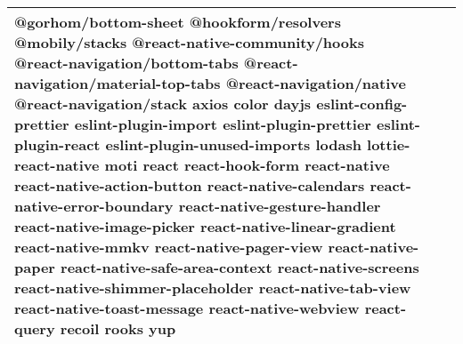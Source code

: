\documentclass[conference, a4paper]{IEEEtran}
\begin{document}
\begin{table} [htp]
\begin{tabular}{p{1.7cm}|p{2.8cm}|p{2.5cm}}
 \newline @gorhom/bottom-sheet \newline @hookform/resolvers \newline @mobily/stacks \newline @react-native-community/hooks \newline @react-navigation/bottom-tabs \newline @react-navigation/material-top-tabs \newline @react-navigation/native \newline @react-navigation/stack \newline axios \newline color \newline dayjs \newline eslint-config-prettier \newline eslint-plugin-import \newline eslint-plugin-prettier \newline eslint-plugin-react \newline eslint-plugin-unused-imports \newline lodash \newline lottie-react-native \newline moti \newline react \newline react-hook-form \newline react-native \newline react-native-action-button \newline react-native-calendars \newline react-native-error-boundary \newline react-native-gesture-handler \newline react-native-image-picker \newline react-native-linear-gradient \newline react-native-mmkv \newline react-native-pager-view \newline react-native-paper \newline react-native-safe-area-context \newline react-native-screens \newline react-native-shimmer-placeholder \newline react-native-tab-view \newline react-native-toast-message \newline react-native-webview \newline react-query \newline recoil \newline rooks \newline yup \\
 \hline
\end{tabular}
\end{table}
\end{document}
